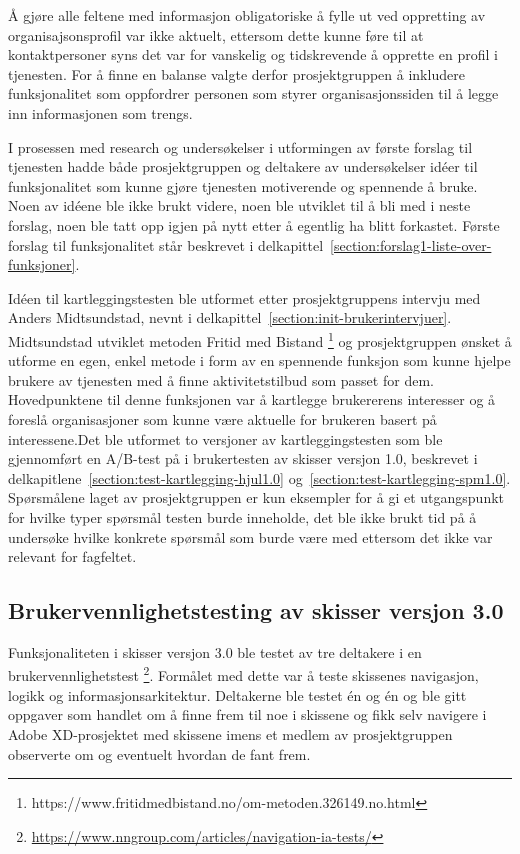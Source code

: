 Å gjøre alle feltene med informasjon obligatoriske å fylle ut ved oppretting av organisajsonsprofil var ikke aktuelt, ettersom dette kunne føre til at kontaktpersoner syns det var for vanskelig og tidskrevende å opprette en profil i tjenesten. For å finne en balanse valgte derfor prosjektgruppen å inkludere funksjonalitet som oppfordrer personen som styrer organisasjonssiden til å legge inn informasjonen som trengs. 

I prosessen med research og undersøkelser i utformingen av første forslag til tjenesten hadde både prosjektgruppen og deltakere av undersøkelser idéer til funksjonalitet som kunne gjøre tjenesten motiverende og spennende å bruke. Noen av idéene ble ikke brukt videre, noen ble utviklet til å bli med i neste forslag, noen ble tatt opp igjen på nytt etter å egentlig ha blitt forkastet. Første forslag til funksjonalitet står beskrevet i delkapittel~\ref{section:forslag1-liste-over-funksjoner}.

Idéen til kartleggingstesten ble utformet etter prosjektgruppens intervju med Anders Midtsundstad, nevnt i delkapittel~\ref{section:init-brukerintervjuer}. Midtsundstad utviklet metoden Fritid med Bistand \footnote{https://www.fritidmedbistand.no/om-metoden.326149.no.html} og prosjektgruppen ønsket å utforme en egen, enkel metode i form av en spennende funksjon som kunne hjelpe brukere av tjenesten med å finne aktivitetstilbud som passet for dem. Hovedpunktene til denne funksjonen var å kartlegge brukererens interesser og å foreslå organisasjoner som kunne være aktuelle for brukeren basert på interessene.Det ble utformet to versjoner av kartleggingstesten som ble gjennomført en A/B-test på i brukertesten av skisser versjon 1.0, beskrevet i delkapitlene~\ref{section:test-kartlegging-hjul1.0} og~\ref{section:test-kartlegging-spm1.0}. Spørsmålene laget av prosjektgruppen er kun eksempler for å gi et utgangspunkt for hvilke typer spørsmål testen burde inneholde, det ble ikke brukt tid på å undersøke hvilke konkrete spørsmål som burde være med ettersom det ikke var relevant for fagfeltet.


\subsection{Brukervennlighetstesting av skisser versjon 3.0}
Funksjonaliteten i skisser versjon 3.0 ble testet av tre deltakere i en brukervennlighetstest \footnote{\url{https://www.nngroup.com/articles/navigation-ia-tests/}}. Formålet med dette var å teste skissenes navigasjon, logikk og informasjonsarkitektur. Deltakerne ble testet én og én og ble gitt oppgaver som handlet om å finne frem til noe i skissene og fikk selv navigere i Adobe XD-prosjektet med skissene imens et medlem av prosjektgruppen observerte om og eventuelt hvordan de fant frem.

